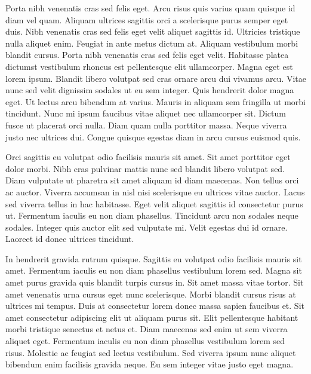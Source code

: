 \documentclass[12pt,ngerman,a4paper,oneside,,tablecaptionabove]{scrbook}
\begin{document}
Porta nibh venenatis cras sed felis eget. Arcu risus quis varius quam
quisque id diam vel quam. Aliquam ultrices sagittis orci a scelerisque
purus semper eget duis. Nibh venenatis cras sed felis eget velit aliquet
sagittis id. Ultricies tristique nulla aliquet enim. Feugiat in ante
metus dictum at. Aliquam vestibulum morbi blandit cursus. Porta nibh
venenatis cras sed felis eget velit. Habitasse platea dictumst
vestibulum rhoncus est pellentesque elit ullamcorper. Magna eget est
lorem ipsum. Blandit libero volutpat sed cras ornare arcu dui vivamus
arcu. Vitae nunc sed velit dignissim sodales ut eu sem integer. Quis
hendrerit dolor magna eget. Ut lectus arcu bibendum at varius. Mauris in
aliquam sem fringilla ut morbi tincidunt. Nunc mi ipsum faucibus vitae
aliquet nec ullamcorper sit. Dictum fusce ut placerat orci nulla. Diam
quam nulla porttitor massa. Neque viverra justo nec ultrices dui. Congue
quisque egestas diam in arcu cursus euismod quis.

Orci sagittis eu volutpat odio facilisis mauris sit amet. Sit amet
porttitor eget dolor morbi. Nibh cras pulvinar mattis nunc sed blandit
libero volutpat sed. Diam vulputate ut pharetra sit amet aliquam id diam
maecenas. Non tellus orci ac auctor. Viverra accumsan in nisl nisi
scelerisque eu ultrices vitae auctor. Lacus sed viverra tellus in hac
habitasse. Eget velit aliquet sagittis id consectetur purus ut.
Fermentum iaculis eu non diam phasellus. Tincidunt arcu non sodales
neque sodales. Integer quis auctor elit sed vulputate mi. Velit egestas
dui id ornare. Laoreet id donec ultrices tincidunt.

In hendrerit gravida rutrum quisque. Sagittis eu volutpat odio facilisis
mauris sit amet. Fermentum iaculis eu non diam phasellus vestibulum
lorem sed. Magna sit amet purus gravida quis blandit turpis cursus in.
Sit amet massa vitae tortor. Sit amet venenatis urna cursus eget nunc
scelerisque. Morbi blandit cursus risus at ultrices mi tempus. Duis at
consectetur lorem donec massa sapien faucibus et. Sit amet consectetur
adipiscing elit ut aliquam purus sit. Elit pellentesque habitant morbi
tristique senectus et netus et. Diam maecenas sed enim ut sem viverra
aliquet eget. Fermentum iaculis eu non diam phasellus vestibulum lorem
sed risus. Molestie ac feugiat sed lectus vestibulum. Sed viverra ipsum
nunc aliquet bibendum enim facilisis gravida neque. Eu sem integer vitae
justo eget magna.
\end{document}
